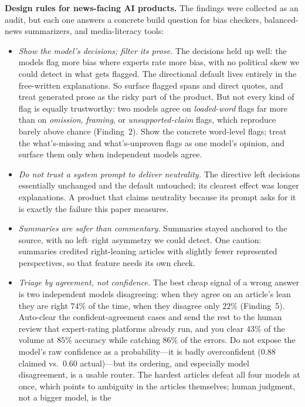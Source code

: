 \documentclass{article}
\begin{document}
\textbf{Design rules for news-facing AI products.} The findings were
collected as an audit, but each one answers a concrete build question
for bias checkers, balanced-news summarizers, and media-literacy tools:
\begin{itemize}
  \item \emph{Show the model's decisions; filter its prose.} The
  decisions held up well: the models flag more bias where experts rate
  more bias, with no political skew we could detect in what gets
  flagged. The directional default lives entirely in the free-written
  explanations. So surface flagged spans and direct quotes, and treat
  generated prose as the risky part of the product. But not every kind
  of flag is equally trustworthy: two models agree on \emph{loaded-word}
  flags far more than on \emph{omission}, \emph{framing}, or
  \emph{unsupported-claim} flags, which reproduce barely above chance
  (Finding~2). Show the concrete word-level flags; treat the
  what's-missing and what's-unproven flags as one model's opinion, and
  surface them only when independent models agree.
  \item \emph{Do not trust a system prompt to deliver neutrality.} The
  directive left decisions essentially unchanged and the default
  untouched; its clearest effect was longer explanations. A product
  that claims neutrality because its prompt asks for it is exactly the
  failure this paper measures.
  \item \emph{Summaries are safer than commentary.} Summaries stayed
  anchored to the source, with no left--right asymmetry we could
  detect. One caution: summaries credited right-leaning articles with
  slightly fewer represented perspectives, so that feature needs its
  own check.
  \item \emph{Triage by agreement, not confidence.} The best cheap
  signal of a wrong answer is two independent models disagreeing: when
  they agree on an article's lean they are right $74\%$ of the time,
  when they disagree only $22\%$ (Finding~5). Auto-clear the
  confident-agreement cases and send the rest to the human review that
  expert-rating platforms already run, and you clear $43\%$ of the
  volume at $85\%$ accuracy while catching $86\%$ of the errors. Do not
  expose the model's raw confidence as a probability---it is badly
  overconfident ($0.88$ claimed vs.\ $0.60$ actual)---but its ordering,
  and especially model disagreement, is a usable router. The hardest
  articles defeat all four models at once, which points to ambiguity in
  the articles themselves; human judgment, not a bigger model, is the

\end{itemize}
\end{document}
